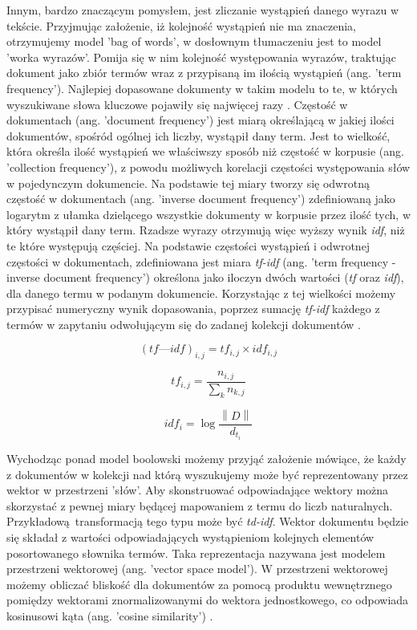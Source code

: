 Innym, bardzo znaczącym pomysłem, jest zliczanie wystąpień danego wyrazu w tekście.
Przyjmując założenie, iż kolejność wystąpień nie ma znaczenia, otrzymujemy model 'bag of words', w dosłownym tłumaczeniu jest to model 'worka wyrazów'.
Pomija się w nim kolejność występowania wyrazów, traktując dokument jako zbiór termów wraz z
przypisaną im ilością wystąpień (ang. 'term frequency'). Najlepiej dopasowane dokumenty w takim
modelu to te, w których wyszukiwane słowa kluczowe pojawiły się najwięcej razy \autocite{introtoinformationretrieval}. Częstość w
dokumentach (ang. 'document frequency') jest miarą określającą w jakiej ilości dokumentów, spośród ogólnej ich liczby, wystąpił
dany term. Jest to wielkość, która określa ilość wystąpień we właściwszy sposób niż częstość w korpusie (ang.
'collection frequency'), z powodu możliwych korelacji częstości występowania słów
w pojedynczym dokumencie. Na podstawie tej miary tworzy się odwrotną częstość w dokumentach
(ang. 'inverse document frequency') zdefiniowaną jako logarytm z ułamka dzielącego wszystkie
dokumenty w korpusie przez ilość tych, w który wystąpił dany term. Rzadsze wyrazy otrzymują więc wyższy wynik
{\it idf}, niż te które występują częściej. Na podstawie częstości wystąpień i odwrotnej częstości w
dokumentach, zdefiniowana jest miara \textit{tf-idf} (ang. 'term frequency - inverse document frequency')
określona jako iloczyn dwóch wartości (\textit{tf} oraz \textit{idf}), dla danego termu w podanym dokumencie.
Korzystając z tej wielkości możemy przypisać numeryczny wynik dopasowania, poprzez sumację \textit{tf-idf} każdego
z termów w zapytaniu odwołującym się do zadanej kolekcji dokumentów \autocite[s. 146-172]{introtoinformationretrieval}.

\begin{equation}
	(tf—idf)_{i,j} = tf_{i,j} \times idf_{i,j}
\end{equation}

\begin{equation}
		tf_{i,j} = \frac{n_{i,j}}{\sum_{k} n_{k,j}}
\end{equation}

\begin{equation}
	idf_i = \log \frac{\left\| D \right\|}{d_{t_i}}
\end{equation}

Wychodząc ponad model boolowski możemy przyjąć założenie mówiące, że każdy z
dokumentów w kolekcji nad którą wyszukujemy może być reprezentowany przez wektor w przestrzeni
'słów'. Aby skonstruować odpowiadające wektory można skorzystać z pewnej miary będącej
mapowaniem z termu do liczb naturalnych. Przykładową transformacją tego typu może być {\it td-idf}.
Wektor dokumentu będzie się składał z wartości odpowiadających wystąpieniom kolejnych elementów posortowanego słownika termów. Taka reprezentacja nazywana jest modelem przestrzeni wektorowej (ang. 'vector space model'). W przestrzeni wektorowej
możemy obliczać bliskość dla dokumentów za pomocą produktu wewnętrznego pomiędzy wektorami znormalizowanymi do
wektora jednostkowego, co odpowiada kosinusowi kąta (ang. 'cosine
similarity') \autocite[s. 157-160]{introtoinformationretrieval}.\newline

